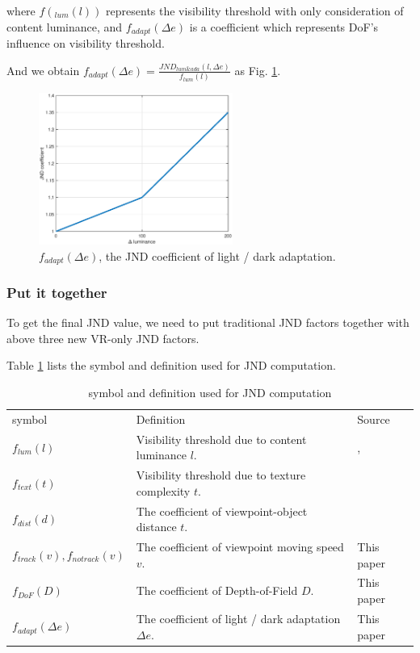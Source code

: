 where $f(_{lum}(l))$ represents the visibility threshold with only consideration of content luminance, and $f_{adapt}(\Delta e)$ is a coefficient which represents DoF's influence on visibility threshold.

And we obtain $f_{adapt}(\Delta e) = \frac{JND_{lum\&ada}(l, \Delta e)}{f_{lum}(l)}$ as Fig. \ref{JNDadapt}.

\begin{figure}
  \centering
  \includegraphics[width=2.5in]{images/JNDadapt.eps}
  \caption{$f_{adapt}(\Delta e)$, the JND coefficient of light / dark adaptation.}
  \label{JNDadapt}
  \end{figure}

\subsubsection{Put it together}

To get the final JND value, we need to put traditional JND factors together with above three new VR-only JND factors. 

Table \ref{table2} lists the symbol and definition used for JND computation.

\begin{table}[h]
\centering
\caption{symbol and definition used for JND computation}\label{table2}
\begin{tabular}{|p{1.5cm}|p{4cm}|p{1.5cm}|}
\hline
symbol & Definition & Source\\
$f_{lum}(l)$ & Visibility threshold due to content luminance $l$. & \cite{PSPNR}, \cite{luminance1}\\
$f_{text}(t)$ & Visibility threshold due to texture complexity $t$. & \cite{PSPNR}\\
$f_{dist}(d)$ & The coefficient of viewpoint-object distance $t$. & \cite{distance}\\
$f_{track}(v), f_{notrack}(v)$ & The coefficient of viewpoint moving speed $v$. & This paper\\
$f_{DoF}(D)$ & The coefficient of Depth-of-Field $D$. & This paper\\
$f_{adapt}(\Delta e)$ & The coefficient of light / dark adaptation $\Delta e$. & This paper\\
\hline
\end{tabular}
\end{table}

